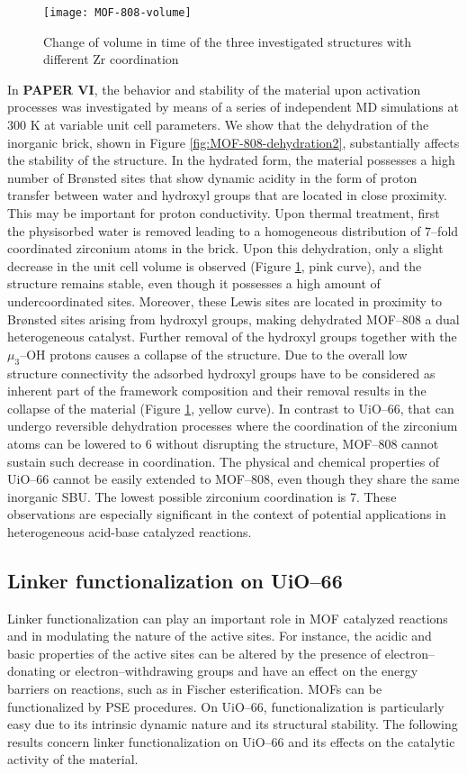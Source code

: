 \npar
\begin{figure}[!htbp]
	\centering
	\texttt{[image: MOF-808-volume]}
	\caption{Change of volume in time of the three investigated structures with different Zr coordination}
	\label{fig:MOF-808-volume}
\end{figure}
In \textbf{PAPER VI}, the behavior and stability of the material upon activation processes was investigated by means of a series of independent MD simulations at 300 K at variable unit cell parameters. We show that the dehydration of the inorganic brick, shown in Figure \ref{fig:MOF-808-dehydration2}, substantially affects the stability of the structure. In the hydrated form, the material possesses a high number of Br\o{}nsted sites that show dynamic acidity in the form of proton transfer between water and hydroxyl groups that are located in close proximity. This may be important for proton conductivity. Upon thermal treatment, first the physisorbed water is removed leading to a homogeneous distribution of 7--fold coordinated zirconium atoms in the brick. Upon this dehydration, only a slight decrease in the unit cell volume is observed (Figure \ref{fig:MOF-808-volume}, pink curve), and the structure remains stable, even though it possesses a high amount of undercoordinated sites. Moreover, these Lewis sites are located in proximity to Br\o{}nsted sites arising from hydroxyl groups, making dehydrated MOF--808 a dual heterogeneous catalyst. Further removal of the hydroxyl groups together with the $\mu_3$--OH protons causes a collapse of the structure. Due to the overall low structure connectivity the adsorbed hydroxyl groups have to be considered as inherent part of the framework composition and their removal results in the collapse of the material (Figure \ref{fig:MOF-808-volume}, yellow curve). In contrast to UiO--66, that can undergo reversible dehydration processes where the coordination of the zirconium atoms can be lowered to 6 without disrupting the structure, MOF--808 cannot sustain such decrease in coordination. The physical and chemical properties of UiO--66 cannot be easily extended to MOF--808, even though they share the same inorganic SBU. The lowest possible zirconium coordination is 7. These observations are especially significant in the context of potential applications in heterogeneous acid-base catalyzed reactions.

\subsection*{Linker functionalization on UiO--66}
Linker functionalization can play an important role in MOF catalyzed reactions and in modulating the nature of the active sites. For instance, the acidic and basic properties of the active sites can be altered by the presence of electron--donating or electron--withdrawing groups and have an effect on the energy barriers on reactions, such as in Fischer esterification. MOFs can be functionalized by PSE procedures. On UiO--66, functionalization is particularly easy due to its intrinsic dynamic nature and its structural stability. The following results concern linker functionalization on UiO--66 and its effects on the catalytic activity of the material. 

